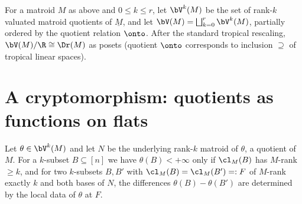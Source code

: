 
\begin{definition}
For a matroid $M$ as above and $0\le k\le r$, let $\bV^k(M)$ be the set of
rank-$k$ valuated matroid quotients of $\underline M$, and let
$\bV(M)=\bigsqcup_{k=0}^{r}\bV^k(M)$, partially ordered by the quotient relation
$\onto$. After the standard tropical rescaling, $\bV(M)/\R\cong\Dr(M)$ as posets
(quotient $\onto$ corresponds to inclusion $\supseteq$ of tropical linear
spaces).
\end{definition}

\section{A cryptomorphism: quotients as functions on flats}


\begin{lemma}\label{lem:flat-support}
Let $\theta\in\bV^k(M)$ and let $N$ be the underlying rank-$k$ matroid of
$\theta$, a quotient of $M$. For a $k$-subset $B\subseteq[n]$ we have
$\theta(B)<+\infty$ only if $\cl_M(B)$ has $M$-rank $\ge k$, and for two
$k$-subsets $B,B'$ with $\cl_M(B)=\cl_M(B')=:F$ of $M$-rank exactly $k$ and both
bases of $N$, the differences $\theta(B)-\theta(B')$ are determined by the local
data of $\theta$ at $F$.
\end{lemma}

